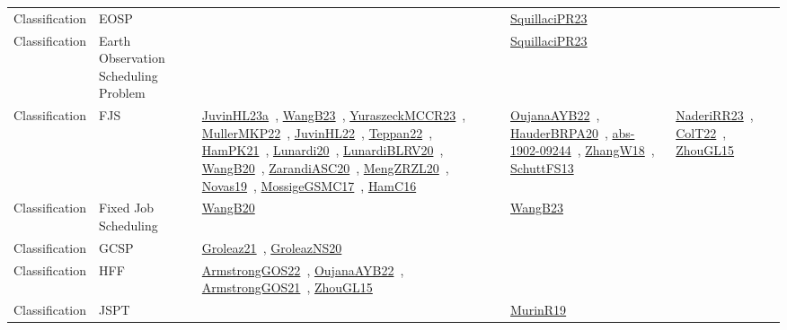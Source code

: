 {\begin{longtable}{lp{3cm}>{\raggedright\arraybackslash}p{6cm}>{\raggedright\arraybackslash}p{6cm}>{\raggedright\arraybackslash}p{8cm}}
Classification & EOSP &  & \href{works/SquillaciPR23.pdf}{SquillaciPR23}~\cite{SquillaciPR23} & \\
Classification & Earth Observation Scheduling Problem &  & \href{works/SquillaciPR23.pdf}{SquillaciPR23}~\cite{SquillaciPR23} & \\
Classification & FJS & \href{works/JuvinHL23a.pdf}{JuvinHL23a}~\cite{JuvinHL23a}, \href{works/WangB23.pdf}{WangB23}~\cite{WangB23}, \href{works/YuraszeckMCCR23.pdf}{YuraszeckMCCR23}~\cite{YuraszeckMCCR23}, \href{works/MullerMKP22.pdf}{MullerMKP22}~\cite{MullerMKP22}, \href{works/JuvinHL22.pdf}{JuvinHL22}~\cite{JuvinHL22}, \href{works/Teppan22.pdf}{Teppan22}~\cite{Teppan22}, \href{works/HamPK21.pdf}{HamPK21}~\cite{HamPK21}, \href{works/Lunardi20.pdf}{Lunardi20}~\cite{Lunardi20}, \href{works/LunardiBLRV20.pdf}{LunardiBLRV20}~\cite{LunardiBLRV20}, \href{works/WangB20.pdf}{WangB20}~\cite{WangB20}, \href{works/ZarandiASC20.pdf}{ZarandiASC20}~\cite{ZarandiASC20}, \href{works/MengZRZL20.pdf}{MengZRZL20}~\cite{MengZRZL20}, \href{works/Novas19.pdf}{Novas19}~\cite{Novas19}, \href{works/MossigeGSMC17.pdf}{MossigeGSMC17}~\cite{MossigeGSMC17}, \href{works/HamC16.pdf}{HamC16}~\cite{HamC16} & \href{works/OujanaAYB22.pdf}{OujanaAYB22}~\cite{OujanaAYB22}, \href{works/HauderBRPA20.pdf}{HauderBRPA20}~\cite{HauderBRPA20}, \href{works/abs-1902-09244.pdf}{abs-1902-09244}~\cite{abs-1902-09244}, \href{works/ZhangW18.pdf}{ZhangW18}~\cite{ZhangW18}, \href{works/SchuttFS13.pdf}{SchuttFS13}~\cite{SchuttFS13} & \href{works/NaderiRR23.pdf}{NaderiRR23}~\cite{NaderiRR23}, \href{works/ColT22.pdf}{ColT22}~\cite{ColT22}, \href{works/ZhouGL15.pdf}{ZhouGL15}~\cite{ZhouGL15}\\
Classification & Fixed Job Scheduling & \href{works/WangB20.pdf}{WangB20}~\cite{WangB20} & \href{works/WangB23.pdf}{WangB23}~\cite{WangB23} & \\
Classification & GCSP & \href{works/Groleaz21.pdf}{Groleaz21}~\cite{Groleaz21}, \href{works/GroleazNS20.pdf}{GroleazNS20}~\cite{GroleazNS20} &  & \\
Classification & HFF & \href{works/ArmstrongGOS22.pdf}{ArmstrongGOS22}~\cite{ArmstrongGOS22}, \href{works/OujanaAYB22.pdf}{OujanaAYB22}~\cite{OujanaAYB22}, \href{works/ArmstrongGOS21.pdf}{ArmstrongGOS21}~\cite{ArmstrongGOS21}, \href{works/ZhouGL15.pdf}{ZhouGL15}~\cite{ZhouGL15} &  & \\
Classification & JSPT &  & \href{works/MurinR19.pdf}{MurinR19}~\cite{MurinR19} & \\

\end{longtable}}

